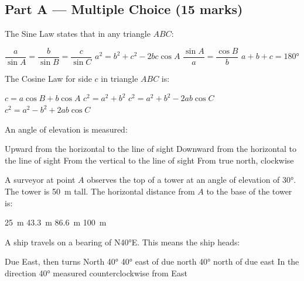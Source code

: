 \documentclass[addpoints]{exam}
\begin{document}
\newpage
\begin{questions}

\section*{Part A --- Multiple Choice (15 marks)}
\vspace{5mm}

\question[1]
The Sine Law states that in any triangle $ABC$:
\begin{choices}
    \correctchoice $\dfrac{a}{\sin A} = \dfrac{b}{\sin B} = \dfrac{c}{\sin C}$
    \choice $a^2 = b^2 + c^2 - 2bc\cos A$
    \choice $\dfrac{\sin A}{a} = \dfrac{\cos B}{b}$
    \choice $a + b + c = 180°$
\end{choices}
\vspace{3mm}

\question[1]
The Cosine Law for side $c$ in triangle $ABC$ is:
\begin{choices}
    \choice $c = a\cos B + b\cos A$
    \choice $c^2 = a^2 + b^2$
    \correctchoice $c^2 = a^2 + b^2 - 2ab\cos C$
    \choice $c^2 = a^2 - b^2 + 2ab\cos C$
\end{choices}
\vspace{3mm}

\question[1]
An angle of elevation is measured:
\begin{choices}
    \correctchoice Upward from the horizontal to the line of sight
    \choice Downward from the horizontal to the line of sight
    \choice From the vertical to the line of sight
    \choice From true north, clockwise
\end{choices}
\vspace{3mm}

\question[1]
A surveyor at point $A$ observes the top of a tower at an angle of elevation of \ang{30}. The tower is \SI{50}{m} tall. The horizontal distance from $A$ to the base of the tower is:
\begin{choices}
    \choice \SI{25}{m}
    \choice \SI{43.3}{m}
    \correctchoice \SI{86.6}{m}
    \choice \SI{100}{m}
\end{choices}
\vspace{3mm}

\question[1]
A ship travels on a bearing of N\ang{40}E. This means the ship heads:
\begin{choices}
    \choice Due East, then turns North \ang{40}
    \correctchoice \ang{40} east of due north
    \choice \ang{40} north of due east
    \choice In the direction \ang{40} measured counterclockwise from East
\end{choices}
\vspace{3mm}


\end{questions}
\end{document}
